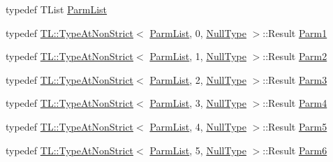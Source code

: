 \begin{DoxyCompactItemize}
\item 
typedef T\+List \mbox{\hyperlink{classUtil_1_1ObjectFactory_a46f003a5928e8a60140e0a74ac261c36}{Parm\+List}}
\item 
typedef \mbox{\hyperlink{structUtil_1_1TL_1_1TypeAtNonStrict}{T\+L\+::\+Type\+At\+Non\+Strict}}$<$ \mbox{\hyperlink{classUtil_1_1ObjectFactory_a46f003a5928e8a60140e0a74ac261c36}{Parm\+List}}, 0, \mbox{\hyperlink{classUtil_1_1NullType}{Null\+Type}} $>$\+::Result \mbox{\hyperlink{classUtil_1_1ObjectFactory_a47e4f863537be7a4f5f5972691bb0b57}{Parm1}}
\item 
typedef \mbox{\hyperlink{structUtil_1_1TL_1_1TypeAtNonStrict}{T\+L\+::\+Type\+At\+Non\+Strict}}$<$ \mbox{\hyperlink{classUtil_1_1ObjectFactory_a46f003a5928e8a60140e0a74ac261c36}{Parm\+List}}, 1, \mbox{\hyperlink{classUtil_1_1NullType}{Null\+Type}} $>$\+::Result \mbox{\hyperlink{classUtil_1_1ObjectFactory_ae438d0c17d1510e6fd7db9ac479a371f}{Parm2}}
\item 
typedef \mbox{\hyperlink{structUtil_1_1TL_1_1TypeAtNonStrict}{T\+L\+::\+Type\+At\+Non\+Strict}}$<$ \mbox{\hyperlink{classUtil_1_1ObjectFactory_a46f003a5928e8a60140e0a74ac261c36}{Parm\+List}}, 2, \mbox{\hyperlink{classUtil_1_1NullType}{Null\+Type}} $>$\+::Result \mbox{\hyperlink{classUtil_1_1ObjectFactory_ae5c679dd2f210e0a5ad257b336f754fb}{Parm3}}
\item 
typedef \mbox{\hyperlink{structUtil_1_1TL_1_1TypeAtNonStrict}{T\+L\+::\+Type\+At\+Non\+Strict}}$<$ \mbox{\hyperlink{classUtil_1_1ObjectFactory_a46f003a5928e8a60140e0a74ac261c36}{Parm\+List}}, 3, \mbox{\hyperlink{classUtil_1_1NullType}{Null\+Type}} $>$\+::Result \mbox{\hyperlink{classUtil_1_1ObjectFactory_a052f09d9e81b11d98bb53a52f327cf01}{Parm4}}
\item 
typedef \mbox{\hyperlink{structUtil_1_1TL_1_1TypeAtNonStrict}{T\+L\+::\+Type\+At\+Non\+Strict}}$<$ \mbox{\hyperlink{classUtil_1_1ObjectFactory_a46f003a5928e8a60140e0a74ac261c36}{Parm\+List}}, 4, \mbox{\hyperlink{classUtil_1_1NullType}{Null\+Type}} $>$\+::Result \mbox{\hyperlink{classUtil_1_1ObjectFactory_a11006cc1ea90957dd8e5604c2d9e069d}{Parm5}}
\item 
typedef \mbox{\hyperlink{structUtil_1_1TL_1_1TypeAtNonStrict}{T\+L\+::\+Type\+At\+Non\+Strict}}$<$ \mbox{\hyperlink{classUtil_1_1ObjectFactory_a46f003a5928e8a60140e0a74ac261c36}{Parm\+List}}, 5, \mbox{\hyperlink{classUtil_1_1NullType}{Null\+Type}} $>$\+::Result \mbox{\hyperlink{classUtil_1_1ObjectFactory_a9f80d25e0964c0e4c204373cd651397a}{Parm6}}
\end{DoxyCompactItemize}
